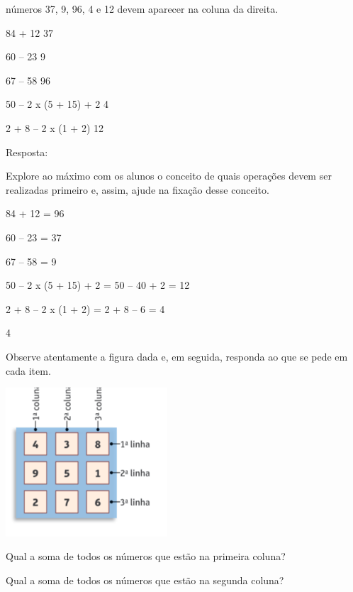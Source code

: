 \begin{escolha}
\Os números 37, 9, 96, 4 e 12 devem aparecer na coluna da direita.

84 + 12                   37

60 -- 23                   9

67 -- 58                    96

50 -- 2 x (5 + 15) + 2      4

2 + 8 -- 2 x (1 + 2)           12



Resposta:

Explore ao máximo com os alunos o conceito de quais operações
devem ser realizadas primeiro e, assim, ajude na fixação desse conceito.

84 + 12 = 96

60 -- 23 = 37

67 -- 58 = 9

50 -- 2 x (5 + 15) + 2 = 50 -- 40 + 2 = 12

2 + 8 -- 2 x (1 + 2) = 2 + 8 -- 6 = 4

\num{4}

Observe atentamente a figura dada e, em seguida, responda ao que se pede em cada item.


\includegraphics[width=2.37521in,height=2.18352in]{media/image21.png}

\begin{escolha}

\item
  Qual a soma de todos os números que estão na primeira coluna?

\item
  Qual a soma de todos os números que estão na segunda coluna?


\end{escolha}
\end{escolha}
